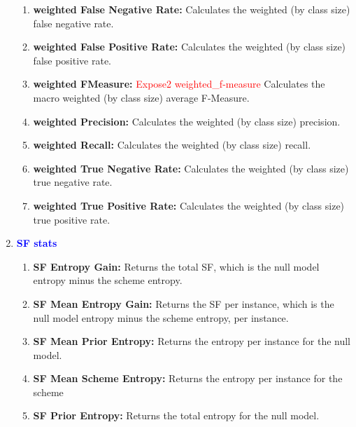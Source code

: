 \documentclass[a4paper,12pt, english]{article}
\begin{document}
\begin{enumerate}
\begin{enumerate}
\item \textbf{weighted False Negative Rate: }
          Calculates the weighted (by class size) false negative rate. 
          
\item \textbf{weighted False Positive Rate: }
          Calculates the weighted (by class size) false positive rate.                    

\item \textbf{weighted FMeasure: } \textcolor{red}{Expose2 weighted\_f-measure}
          Calculates the macro weighted (by class size) average F-Measure. 
                 
\item \textbf{weighted Precision: }
          Calculates the weighted (by class size) precision. 
                    
\item \textbf{weighted Recall: }
          Calculates the weighted (by class size) recall.          

\item \textbf{weighted True Negative Rate: }
          Calculates the weighted (by class size) true negative rate. 

\item \textbf{weighted True Positive Rate: }
          Calculates the weighted (by class size) true positive rate. 
\end{enumerate}
     

\item \textbf{\textcolor{blue}{SF stats}}
\begin{enumerate}
              
\item \textbf{SF Entropy Gain: }
          Returns the total SF, which is the null model entropy minus the scheme entropy.    
          

\item \textbf{SF Mean Entropy Gain: }
          Returns the SF per instance, which is the null model entropy minus the scheme entropy, per instance.         
          

\item \textbf{SF Mean Prior Entropy: }
          Returns the entropy per instance for the null model.       
          
\item \textbf{SF Mean Scheme Entropy: }
          Returns the entropy per instance for the scheme        


\item \textbf{SF Prior Entropy: }
          Returns the total entropy for the null model.
          

\end{enumerate}
\end{enumerate}
\end{document}
